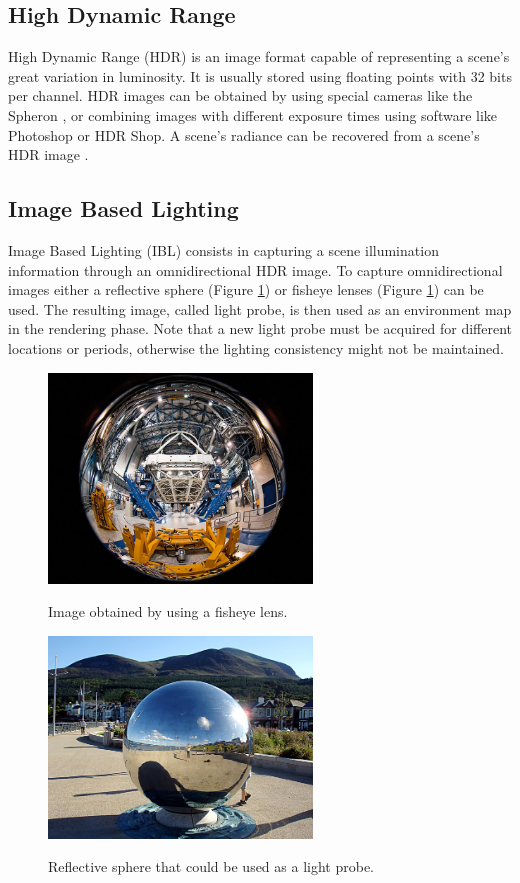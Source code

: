 \documentclass[conference]{acmsiggraph}
\begin{document}
\subsection{High Dynamic Range}

	High Dynamic Range (HDR) is an image format capable of representing a scene’s great variation in luminosity. It is usually stored using floating points with 32 bits per channel. 
	HDR images can be obtained by using special cameras like the Spheron \cite{spheron}, or combining images with different exposure times using software like Photoshop or HDR Shop. 
	A scene’s radiance can be recovered from a scene’s HDR image \cite{debevec1997}.

\subsection{Image Based Lighting}

	Image Based Lighting (IBL) \cite{debevec2002} consists in capturing a scene illumination information through an omnidirectional HDR image. To capture omnidirectional images either 
	a reflective sphere (Figure \ref{fig:fisheye}) or fisheye lenses (Figure \ref{fig:fisheye}) can be used. The resulting image, called light probe, is then used as an environment 
	map in the rendering phase. Note that a new light probe must be acquired for different locations or periods, otherwise the lighting consistency might not be maintained.

	\begin{figure}[!ht]
		\caption{Image obtained by using a fisheye lens.}
		\centering
		\includegraphics[width=7cm]{images/fisheye.jpg}
		\label{fig:fisheye}
	\end{figure}

	\begin{figure}[!ht]
		\caption{Reflective sphere that could be used as a light probe.}
		\centering
		\includegraphics[width=7cm]{images/lightprobe.jpg}
		\label{fig:lightprobe}
	\end{figure}
\end{document}
